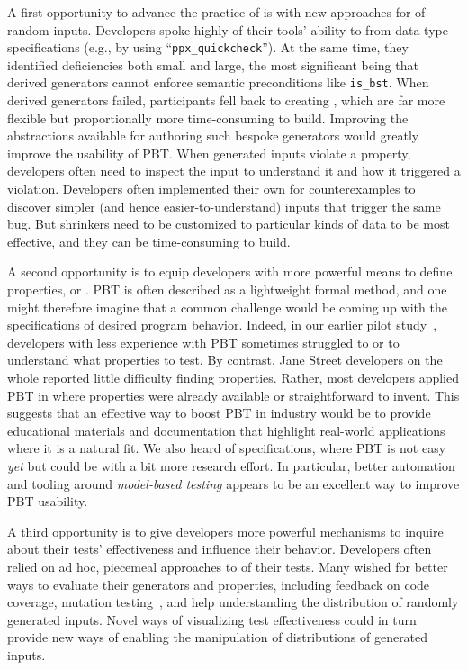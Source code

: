 A first opportunity to advance the practice of is with new approaches for
 of random inputs. Developers spoke highly
of their tools' ability to  from data type specifications (e.g., by using ``\texttt{ppx\_quickcheck}''). At the same time,
they identified deficiencies both
small and large, the most significant being that derived generators
cannot enforce semantic preconditions like \lstinline{is_bst}.
%
When derived generators failed, participants fell back to creating
, which are far more flexible but
proportionally more time-consuming to build.  Improving the
abstractions available for authoring such bespoke generators would
greatly improve the usability of PBT.
%
When generated inputs violate a property, developers often need to
inspect the input to understand it and how it triggered a violation.
Developers often
implemented their own  for counterexamples to discover
simpler (and hence easier-to-understand) inputs that trigger the same bug.
%
But shrinkers need to be customized to particular kinds of data to be
most effective, and they can be time-consuming to build.

A second opportunity is to equip developers
with more powerful means to define properties, or .  PBT is often described as
a lightweight formal method, and one might therefore imagine that a
common challenge would be coming up with the specifications of desired
program behavior. Indeed, in our earlier pilot
study~\cite{goldstein_problems_2022}, developers with less experience
with PBT sometimes struggled to  or to
understand what properties to test.  By contrast, Jane Street
developers on the whole reported little difficulty finding
properties. Rather, most developers applied PBT in
 where properties were already
available or straightforward to invent.  This suggests that an
effective way to boost PBT in industry would be to provide educational
materials and documentation that highlight real-world applications
where it is a natural fit.
%
We also heard  of
specifications, where PBT is not easy {\em yet} but could be with a
bit more research effort.  In particular, better automation and
tooling around {\em model-based testing} appears to be an excellent
way to improve PBT usability.

A third opportunity is to give developers more powerful
 mechanisms to inquire about their tests'
effectiveness
and influence their behavior. Developers often relied on ad hoc,
piecemeal approaches to  of their
tests. Many wished for better ways to evaluate their generators and
properties, including feedback on code coverage, mutation
testing~\cite{papadakis_mutation_2018}, and help understanding the
distribution of randomly generated inputs. Novel ways of visualizing
test effectiveness could in turn provide new ways of enabling the
manipulation of distributions of generated inputs.

